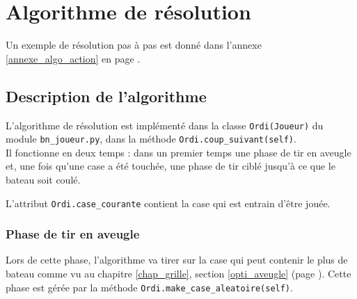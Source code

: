 \chapter{Algorithme de résolution}
Un exemple de résolution pas à pas est donné dans l'annexe \ref{annexe_algo_action} en page \pageref{annexe_algo_action}.
\section{Description de l'algorithme}


L'algorithme de résolution est implémenté dans la classe \texttt{Ordi(Joueur)} du module \texttt{bn\_joueur.py}, dans la méthode \texttt{Ordi.coup\_suivant(self)}.\\
Il fonctionne en deux temps : dans un premier temps une phase de tir en aveugle et, une fois qu'une case a été touchée, une phase de tir ciblé jusqu'à ce que le bateau soit coulé.

L'attribut \texttt{Ordi.case\_courante} contient la case qui est entrain d'être jouée.
\subsection{Phase de tir en aveugle}
Lors de cette phase, l'algorithme va tirer sur la case qui peut contenir le plus de bateau comme vu au chapitre \ref{chap_grille}, section \ref{opti_aveugle} (page \pageref{opti_aveugle}). Cette phase est gérée par la méthode \texttt{Ordi.make\_case\_aleatoire(self)}.

